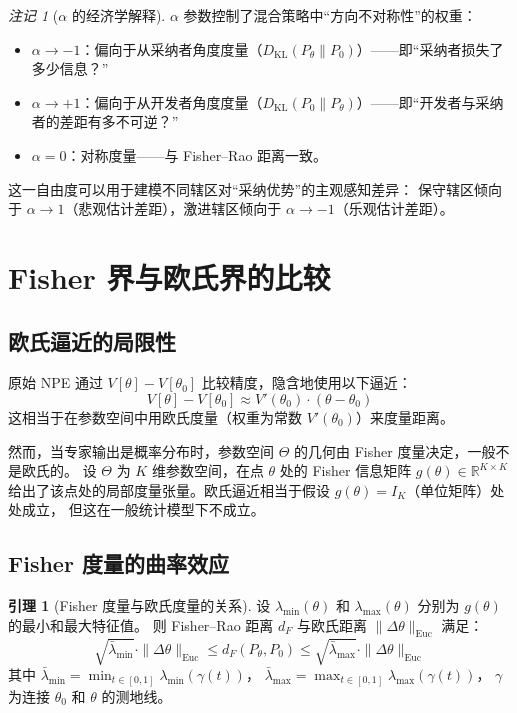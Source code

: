 \documentclass[12pt,a4paper]{article}
\theoremstyle{definition}
\newtheorem{lemma}{引理}[section]
\theoremstyle{remark}
\newtheorem{remark}{注记}[section]
\newcommand{\R}{\mathbb{R}}
\newcommand{\Fisher}{g}
\newcommand{\KL}{D_{\text{KL}}}
\begin{document}
\begin{remark}[$\alpha$ 的经济学解释]
$\alpha$ 参数控制了混合策略中“方向不对称性”的权重：
\begin{itemize}
    \item $\alpha \to -1$：偏向于从采纳者角度度量（$\KL(P_\theta\|P_0)$）——即“采纳者损失了多少信息？”
    \item $\alpha \to +1$：偏向于从开发者角度度量（$\KL(P_0\|P_\theta)$）——即“开发者与采纳者的差距有多不可逆？”
    \item $\alpha = 0$：对称度量——与 Fisher--Rao 距离一致。
\end{itemize}
这一自由度可以用于建模不同辖区对“采纳优势”的主观感知差异：
保守辖区倾向于 $\alpha \to 1$（悲观估计差距），激进辖区倾向于 $\alpha \to -1$（乐观估计差距）。
\end{remark}

\section{Fisher 界与欧氏界的比较}

\subsection{欧氏逼近的局限性}

原始 NPE 通过 $V[\theta] - V[\theta_0]$ 比较精度，隐含地使用以下逼近：
\begin{equation}
    V[\theta] - V[\theta_0] \approx V'(\theta_0) \cdot (\theta - \theta_0) \label{eq:V_linear}
\end{equation}
这相当于在参数空间中用欧氏度量（权重为常数 $V'(\theta_0)$）来度量距离。

然而，当专家输出是概率分布时，参数空间 $\Theta$ 的几何由 Fisher 度量决定，一般不是欧氏的。
设 $\Theta$ 为 $K$ 维参数空间，在点 $\theta$ 处的 Fisher 信息矩阵 $\Fisher(\theta) \in \R^{K \times K}$
给出了该点处的局部度量张量。欧氏逼近相当于假设 $\Fisher(\theta) = I_K$（单位矩阵）处处成立，
但这在一般统计模型下不成立。

\subsection{Fisher 度量的曲率效应}

\begin{lemma}[Fisher 度量与欧氏度量的关系]\label{lem:fisher_vs_euc}
设 $\lambda_{\min}(\theta)$ 和 $\lambda_{\max}(\theta)$ 分别为 $\Fisher(\theta)$ 的最小和最大特征值。
则 Fisher--Rao 距离 $d_F$ 与欧氏距离 $\|\Delta\theta\|_{\text{Euc}}$ 满足：
\begin{equation}
    \sqrt{\bar{\lambda}_{\min}} \cdot \|\Delta\theta\|_{\text{Euc}} \leq d_F(P_\theta, P_0) \leq \sqrt{\bar{\lambda}_{\max}} \cdot \|\Delta\theta\|_{\text{Euc}} \label{eq:fisher_sandwich}
\end{equation}
其中 $\bar{\lambda}_{\min} = \min_{t \in [0,1]} \lambda_{\min}(\gamma(t))$，
$\bar{\lambda}_{\max} = \max_{t \in [0,1]} \lambda_{\max}(\gamma(t))$，
$\gamma$ 为连接 $\theta_0$ 和 $\theta$ 的测地线。
\end{lemma}
\end{document}
